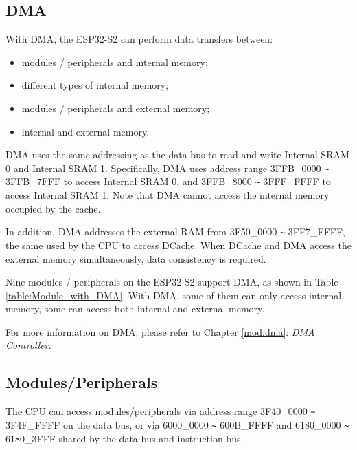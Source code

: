 \documentclass[main\_\_EN.tex]{subfiles}
\begin{document}
\subsection{DMA}
With DMA, the ESP32-S2 can perform data transfers between:
\begin{itemize}
\item modules / peripherals and internal memory;
\item different types of internal memory;
\item modules / peripherals and external memory;
\item internal and external memory.
\end{itemize}

DMA uses the same addressing as the data bus to read and write Internal SRAM 0 and Internal SRAM 1. Specifically, DMA uses address range \hexprefix{}3FFB\_0000 \verb+~+ \hexprefix{}3FFB\_7FFF to access Internal SRAM 0, and \hexprefix{}3FFB\_8000 \verb+~+ \hexprefix{}3FFF\_FFFF to access Internal SRAM 1. Note that DMA cannot access the internal memory occupied by the cache.

In addition, DMA addresses the external RAM from \hexprefix{}3F50\_0000 \verb+~+ \hexprefix{}3FF7\_FFFF, the same used by the CPU to access DCache. When DCache and DMA access the external memory simultaneously, data consistency is required.

Nine modules / peripherals on the ESP32-S2 support DMA, as shown in Table \ref{table:Module_with_DMA}. With DMA, some of them can only access internal memory, some can access both internal and external memory.

For more information on DMA, please refer to Chapter \ref{mod:dma}: \textit{DMA Controller}.



\subsection{Modules/Peripherals}

The CPU can access modules/peripherals via address range \hexprefix{}3F40\_0000 \verb+~+ \hexprefix{}3F4F\_FFFF on the data bus, or via \hexprefix{}6000\_0000 \verb+~+ \hexprefix{}600B\_FFFF and \hexprefix{}6180\_0000 \verb+~+ \hexprefix{}6180\_3FFF shared by the data bus and instruction bus.
\end{document}
